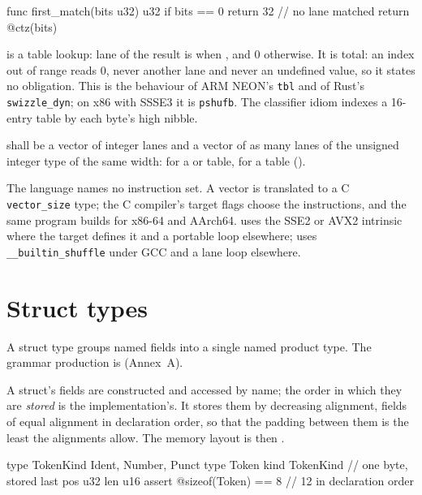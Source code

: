 \begin{laincode}
func first_match(bits u32) u32 {
    if bits == 0 { return 32 }      // no lane matched
    return @ctz(bits)
}
\end{laincode}

\pnum
{} is a table lookup: lane  of the result is
 when , and 0 otherwise. It is total: an index out of range
reads 0, never another lane and never an undefined value, so it states no obligation. This is
the behaviour of ARM NEON's \texttt{tbl} and of Rust's \texttt{swizzle\_dyn}; on x86 with SSSE3
it is \texttt{pshufb}. The classifier idiom  indexes a
16-entry table by each byte's high nibble.

\begin{constraint}
   shall be a vector of integer lanes and  a vector of as many lanes of the
  unsigned integer type of the same width:  for a  or 
  table,  for a  table ().
\end{constraint}

\pnum
The language names no instruction set. A vector is translated to a C \texttt{vector\_size}
type; the C compiler's target flags choose the instructions, and the same program builds for
x86-64 and AArch64.  uses the SSE2 or AVX2 intrinsic where the target defines
it and a portable loop elsewhere;  uses \texttt{\_\_builtin\_shuffle} under GCC
and a lane loop elsewhere.

\section{Struct types}
\label{sec:types.struct}

\pnum
A struct type groups named fields into a single named product type.  The
grammar production is  (Annex~A).

\pnum
A struct's fields are constructed and accessed by name; the order in which they are
\emph{stored} is the implementation's. It stores them by decreasing alignment, fields of equal
alignment in declaration order, so that the padding between them is the least the alignments
allow. The memory layout is then .

\begin{laincode}
type TokenKind { Ident, Number, Punct }
type Token {
    kind TokenKind      // one byte, stored last
    pos  u32
    len  u16
}
assert @sizeof(Token) == 8     // 12 in declaration order
\end{laincode}

